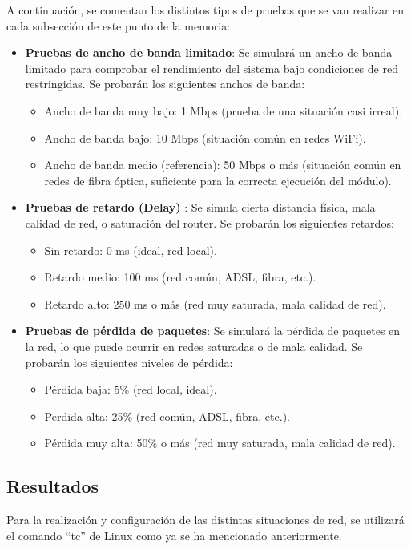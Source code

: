 A continuación, se comentan los distintos tipos de pruebas que se van realizar en cada subsección de este punto de la memoria:
\begin{itemize}
    \item \textbf{Pruebas de ancho de banda limitado}: Se simulará un ancho de banda limitado para comprobar el rendimiento del sistema bajo condiciones de red restringidas. Se probarán los siguientes anchos de banda:
    \begin{itemize}
        \item Ancho de banda muy bajo: 1 Mbps (prueba de una situación casi irreal).
        \item Ancho de banda bajo: 10 Mbps (situación común en redes WiFi).
        \item Ancho de banda medio (referencia): 50 Mbps o más (situación común en redes de fibra óptica, suficiente para la correcta ejecución del módulo).
    \end{itemize}
    \item \textbf{Pruebas de retardo (Delay)} : Se simula cierta distancia física, mala calidad de red, o saturación del router. Se probarán los siguientes retardos:
    \begin{itemize}
        \item Sin retardo: 0 ms (ideal, red local).
        \item Retardo medio: 100 ms (red común, ADSL, fibra, etc.).
        \item Retardo alto: 250 ms o más (red muy saturada, mala calidad de red).
    \end{itemize}
    \item \textbf{Pruebas de pérdida de paquetes}: Se simulará la pérdida de paquetes en la red, lo que puede ocurrir en redes saturadas o de mala calidad. Se probarán los siguientes niveles de pérdida: 
    \begin{itemize}
        \item Pérdida baja: 5\% (red local, ideal).
        \item Perdida alta: 25\% (red común, ADSL, fibra, etc.).
        \item Pérdida muy alta: 50\% o más (red muy saturada, mala calidad de red).
    \end{itemize}
\end{itemize}

\newpage

\subsection{Resultados}
Para la realización y configuración de las distintas situaciones de red, se utilizará el comando ``tc'' de Linux como ya se ha mencionado anteriormente. 
\vspace{\baselineskip}

